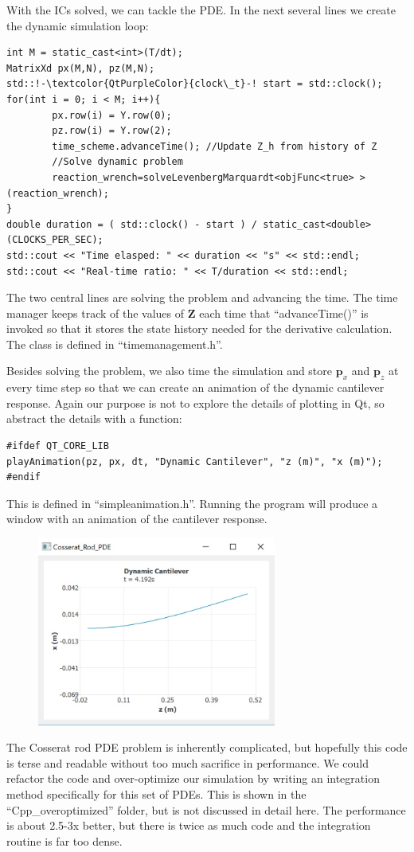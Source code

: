 \documentclass[12pt]{article}
\begin{document}
With the ICs solved, we can tackle the PDE. In the next several lines we create the dynamic simulation loop:
\begin{lstlisting}
int M = static_cast<int>(T/dt);
MatrixXd px(M,N), pz(M,N);
std::!-\textcolor{QtPurpleColor}{clock\_t}-! start = std::clock();
for(int i = 0; i < M; i++){
		px.row(i) = Y.row(0);
		pz.row(i) = Y.row(2);
		time_scheme.advanceTime(); //Update Z_h from history of Z
		//Solve dynamic problem
		reaction_wrench=solveLevenbergMarquardt<objFunc<true> >(reaction_wrench);
}
double duration = ( std::clock() - start ) / static_cast<double>(CLOCKS_PER_SEC);
std::cout << "Time elasped: " << duration << "s" << std::endl;
std::cout << "Real-time ratio: " << T/duration << std::endl;
\end{lstlisting}
The two central lines are solving the problem and advancing the time. The time manager keeps track of the values of $\boldsymbol{Z}$ each time that ``advanceTime()'' is invoked so that it stores the state history needed for the derivative calculation. The class is defined in ``timemanagement.h''.

Besides solving the problem, we also time the simulation and store $\boldsymbol{p}_x$ and $\boldsymbol{p}_z$ at every time step so that we can create an animation of the dynamic cantilever response. Again our purpose is not to explore the details of plotting in Qt, so abstract the details with a function:
\begin{lstlisting}
#ifdef QT_CORE_LIB
playAnimation(pz, px, dt, "Dynamic Cantilever", "z (m)", "x (m)");
#endif
\end{lstlisting}
This is defined in ``simpleanimation.h''. Running the program will produce a window with an animation of the cantilever response.
\begin{figure}[h]
	\centering
		\includegraphics[width=0.7\textwidth]{fig/SolutionPlot.jpg}
	\label{fig:SolutionPlot}
\end{figure}

The Cosserat rod PDE problem is inherently complicated, but hopefully this code is terse and readable without too much sacrifice in performance. We could refactor the code and over-optimize our simulation by writing an integration method specifically for this set of PDEs. This is shown in the ``Cpp\_overoptimized'' folder, but is not discussed in detail here. The performance is about 2.5-3x better, but there is twice as much code and the integration routine is far too dense.
\end{document}
